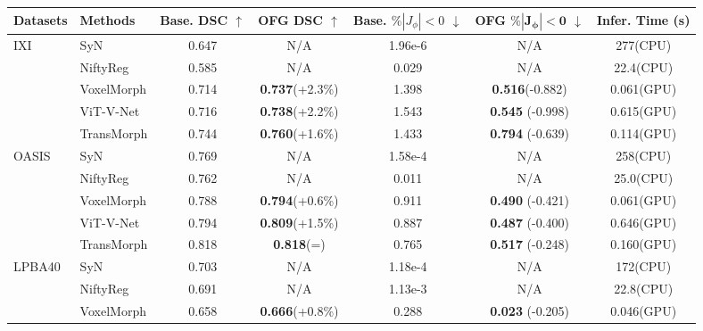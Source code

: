 \documentclass[10pt,twocolumn,letterpaper]{article}
\begin{document}
\begin{table*}[t]
    \begin{center}
    {\small{
    \begin{tabular}{llccccc}
\toprule
    Datasets & Methods & Base. DSC $\uparrow$ & \textbf{OFG DSC} $\uparrow$ & Base. $\% |J_{\phi}| < 0$ $\downarrow$ & \textbf{OFG $\mathbf{\% |J_{\phi}| < 0}$} $\downarrow$ & Infer. Time (s)\\
    \midrule
    \multirow{5}{*}{IXI \cite{ixi}} 
    & SyN \cite{AVANTS200826} & 0.647 & N/A & 1.96e-6 & N/A & 277(CPU) \\
    & NiftyReg \cite{niftyreg} & 0.585 & N/A & 0.029 & N/A & 22.4(CPU) \\
    \noalign{\smallskip}
    \cline{2-7}
    \noalign{\smallskip}
    & VoxelMorph \cite{Balakrishnan_2019} & 0.714 & \textbf{0.737}(+2.3\%) & 1.398 & \textbf{0.516}(-0.882) & 0.061(GPU) \\
    & ViT-V-Net \cite{chen2021vitvnet} & 0.716 & \textbf{0.738}(+2.2\%) & 1.543 & \textbf{0.545} (-0.998) & 0.615(GPU) \\
    & TransMorph \cite{Chen_2022} & 0.744 & \textbf{0.760}(+1.6\%) & 1.433 & \textbf{0.794} (-0.639) & 0.114(GPU) \\
    \midrule
    \multirow{5}{*}{OASIS \cite{10.1162/jocn.2007.19.9.1498}} 
    & SyN \cite{AVANTS200826} & 0.769 & N/A & 1.58e-4 & N/A & 258(CPU) \\
    & NiftyReg \cite{niftyreg} & 0.762 & N/A & 0.011 & N/A & 25.0(CPU) \\
    \noalign{\smallskip}
    \cline{2-7}
    \noalign{\smallskip}
    & VoxelMorph \cite{Balakrishnan_2019} & 0.788 & \textbf{0.794}(+0.6\%) & 0.911 & \textbf{0.490} (-0.421) & 0.061(GPU) \\
    & ViT-V-Net \cite{chen2021vitvnet} & 0.794 & \textbf{0.809}(+1.5\%) & 0.887 & \textbf{0.487} (-0.400) & 0.646(GPU) \\
    & TransMorph \cite{Chen_2022} & 0.818 & \textbf{0.818}(=) & 0.765 & \textbf{0.517} (-0.248) & 0.160(GPU) \\
    \midrule
    \multirow{5}{*}{LPBA40 \cite{lpba}} 
    & SyN \cite{AVANTS200826} & 0.703 & N/A & 1.18e-4 & N/A & 172(CPU) \\
    & NiftyReg \cite{niftyreg} & 0.691 & N/A & 1.13e-3 & N/A & 22.8(CPU) \\
    \noalign{\smallskip}
    \cline{2-7}
    \noalign{\smallskip}
    & VoxelMorph \cite{Balakrishnan_2019} & 0.658 & \textbf{0.666}(+0.8\%) & 0.288 & \textbf{0.023} (-0.205) & 0.046(GPU) \\

\end{tabular}}}
\end{center}
\end{table*}
\end{document}

